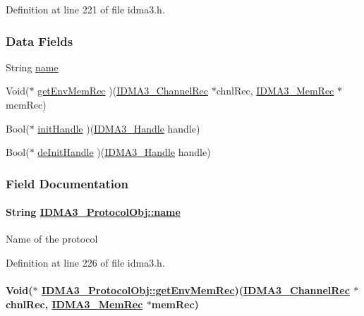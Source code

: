 Definition at line 221 of file idma3.h.\subsubsection*{Data Fields}
\begin{CompactItemize}
\item 
String \hyperlink{struct_i_d_m_a3___protocol_obj_e79494308149dd394cf13ceb8ba7c439}{name}
\item 
Void($\ast$ \hyperlink{struct_i_d_m_a3___protocol_obj_8985b385f24d611a7e65f1b6fc867159}{get\-Env\-Mem\-Rec} )(\hyperlink{struct_i_d_m_a3___channel_rec}{IDMA3\_\-Channel\-Rec} $\ast$chnl\-Rec, \hyperlink{struct_i_d_m_a3___mem_rec}{IDMA3\_\-Mem\-Rec} $\ast$mem\-Rec)
\item 
Bool($\ast$ \hyperlink{struct_i_d_m_a3___protocol_obj_147bfd9a69a93542195adcdea86a6a58}{init\-Handle} )(\hyperlink{struct_i_d_m_a3___obj}{IDMA3\_\-Handle} handle)
\item 
Bool($\ast$ \hyperlink{struct_i_d_m_a3___protocol_obj_7ce1036a56ee66ca9d0a195c04e40518}{de\-Init\-Handle} )(\hyperlink{struct_i_d_m_a3___obj}{IDMA3\_\-Handle} handle)
\end{CompactItemize}


\subsubsection{Field Documentation}
\hypertarget{struct_i_d_m_a3___protocol_obj_e79494308149dd394cf13ceb8ba7c439}{
\paragraph[name]{\setlength{\rightskip}{0pt plus 5cm}String \hyperlink{struct_i_d_m_a3___protocol_obj_e79494308149dd394cf13ceb8ba7c439}{IDMA3\_\-Protocol\-Obj::name}}\hfill}
\label{struct_i_d_m_a3___protocol_obj_e79494308149dd394cf13ceb8ba7c439}


Name of the protocol 

Definition at line 226 of file idma3.h.\hypertarget{struct_i_d_m_a3___protocol_obj_8985b385f24d611a7e65f1b6fc867159}{
\paragraph[getEnvMemRec]{\setlength{\rightskip}{0pt plus 5cm}Void($\ast$ \hyperlink{struct_i_d_m_a3___protocol_obj_8985b385f24d611a7e65f1b6fc867159}{IDMA3\_\-Protocol\-Obj::get\-Env\-Mem\-Rec})(\hyperlink{struct_i_d_m_a3___channel_rec}{IDMA3\_\-Channel\-Rec} $\ast$chnl\-Rec, \hyperlink{struct_i_d_m_a3___mem_rec}{IDMA3\_\-Mem\-Rec} $\ast$mem\-Rec)}\hfill}
\label{struct_i_d_m_a3___protocol_obj_8985b385f24d611a7e65f1b6fc867159}


